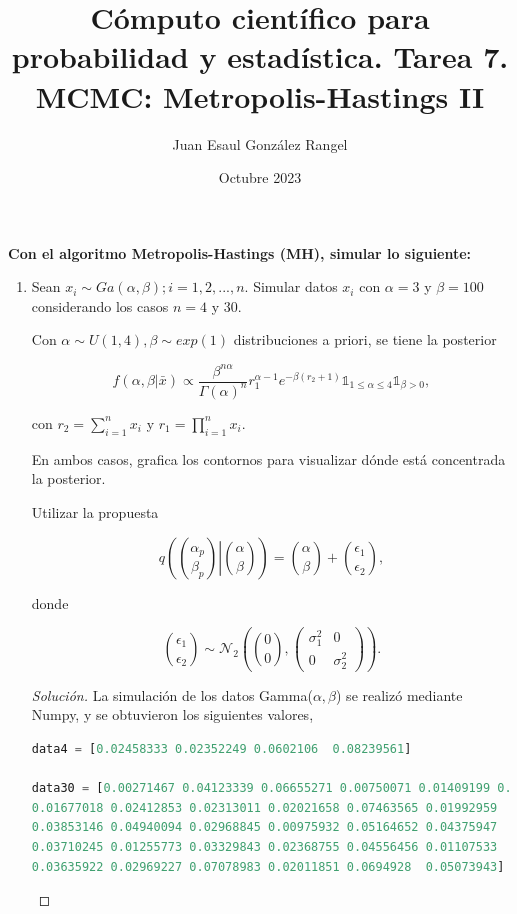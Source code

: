 \documentclass{article}
\title{Cómputo científico para probabilidad y estadística. Tarea 7.\\
MCMC: Metropolis-Hastings II}
\author{Juan Esaul González Rangel}
\date{Octubre 2023}
\begin{document}
\maketitle

\textbf{ \large Con el algoritmo Metropolis-Hastings (MH), simular lo siguiente: }

\begin{enumerate}

    \item Sean $x_i \sim Ga(\alpha, \beta); i = 1, 2, . . . , n$. Simular datos $x_i$ 
    con $\alpha = 3$ y $\beta = 100$ considerando los casos $n = 4$ y 30.
    
    Con $\alpha \sim U(1,4), \beta \sim exp(1)$ distribuciones a priori, se tiene la 
    posterior

    \[ f(\alpha, \beta | \bar x) \propto \frac{\beta^{n\alpha}}{\Gamma(\alpha)^n} 
    r_1^{\alpha - 1} e^{-\beta(r_2 + 1)} \mathds 1_{1 \le \alpha \le 4} 
    \mathds 1_{\beta > 0}, \]

    con $r_2 = \sum_{i=1}^n x_i$ y $r_1 = \prod_{i=1}^n x_i$.

    En ambos casos, grafica los contornos para visualizar dónde está concentrada la posterior.
    
    Utilizar la propuesta

    \[ q \left( \binom{\alpha_p}{\beta_p} \left| \binom{\alpha}\beta \right. \right) = 
    \binom{\alpha}{\beta} + \binom{\epsilon_1}{\epsilon_2}, \]

    donde

    \[ \binom{\epsilon_1}{\epsilon_2} \sim \mathcal N_2\left( \binom 00, \begin{pmatrix}
        \sigma_1^2 & 0 \\
        0 & \sigma_2^2
    \end{pmatrix} \right). \]



    \begin{proof}[Solución]

    La simulación de los datos Gamma($\alpha,\beta$) se realizó mediante Numpy, y se obtuvieron
    los siguientes valores,

    \begin{lstlisting}[language=Python]
data4 = [0.02458333 0.02352249 0.0602106  0.08239561]

data30 = [0.00271467 0.04123339 0.06655271 0.00750071 0.01409199 0.02545264
0.01677018 0.02412853 0.02313011 0.02021658 0.07463565 0.01992959
0.03853146 0.04940094 0.02968845 0.00975932 0.05164652 0.04375947
0.03710245 0.01255773 0.03329843 0.02368755 0.04556456 0.01107533
0.03635922 0.02969227 0.07078983 0.02011851 0.0694928  0.05073943]\end{lstlisting}


\end{proof}
\end{enumerate}
\end{document}

